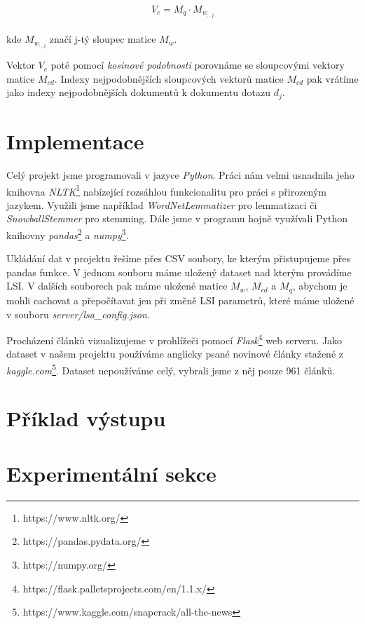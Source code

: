 \documentclass[11pt]{scrartcl} %
\begin{document}
\begin{align}
	\begin{split}
		V_c = M_q \cdot M_{w_{:,j}}
	\end{split}					
\end{align}

kde $M_{w_{:,j}}$ značí j-tý sloupec matice $M_w$.

\bigskip

Vektor $V_c$ poté pomocí \emph{kosinové podobnosti} porovnáme se sloupcovými vektory matice $M_{cd}$. Indexy nejpodobnějších sloupcových vektorů matice $M_{cd}$ pak vrátíme jako indexy nejpodobnějších dokumentů k dokumentu dotazu $d_j$.

\section{Implementace}

Celý projekt jsme programovali v jazyce \emph{Python}. Práci nám velmi usnadnila jeho knihovna \emph{NLTK}\footnote{https://www.nltk.org/} nabízející rozsáhlou funkcionalitu pro práci s přirozeným jazykem. Využili jsme například \emph{WordNetLemmatizer} pro lemmatizaci či \emph{SnowballStemmer} pro stemming. Dále jsme v programu hojně využívali Python knihovny \emph{pandas}\footnote{https://pandas.pydata.org/} a \emph{numpy}\footnote{https://numpy.org/}.

\bigskip

Ukládání dat v projektu řešíme přes CSV soubory, ke kterým přistupujeme přes pandas funkce. V jednom souboru máme uložený dataset nad kterým provádíme LSI. V dalších souborech pak máme uložené matice $M_w$, $M_{cd}$ a $M_q$, abychom je mohli cachovat a přepočítavat jen při změně LSI parametrů, které máme uložené v souboru \emph{server/lsa\_config.json}.

\bigskip

Procházení článků vizualizujeme v prohlížeči pomocí \emph{Flask}\footnote{https://flask.palletsprojects.com/en/1.1.x/} web serveru. Jako dataset v našem projektu používáme anglicky psané novinové články stažené z \emph{kaggle.com}\footnote{https://www.kaggle.com/snapcrack/all-the-news}. Dataset nepoužíváme celý, vybrali jsme z něj pouze 961 článků.

\section{Příklad výstupu}

\section{Experimentální sekce}
\end{document}
